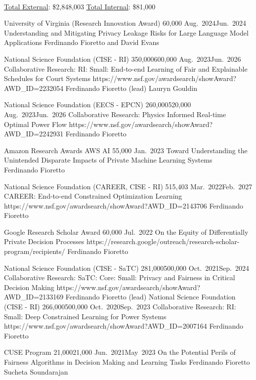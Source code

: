 \
\begin{keywords}
{\underline{Total External}: \$2,848,003 %
\hspace{8pt} \underline{Total Internal}: \$81,000}%
\end{keywords}


\begin{projects}
	\grantentrySinglePI
	{University of Virginia (Research Innovation Award)}
	{60,000}
	{Aug.~2024}{Jun.~2024}
	{Understanding and Mitigating Privacy Leakage Risks for Large Language Model Applications}
	{}
	{Ferdinando Fioretto and David Evans}

	\grantentrycoPI
	{National Science Foundation (CISE - RI)}
	{350,000}{600,000}
	{Aug.~2023}{Jun.~2026}
	{Collaborative Research: RI: Small: End-to-end Learning of Fair and Explainable Schedules for Court Systems}
	{https://www.nsf.gov/awardsearch/showAward?AWD_ID=2232054}
	{Ferdinando Fioretto (lead)}
	{Lauryn Gouldin}

	\grantentryPI
	{National Science Foundation (EECS - EPCN)}
	{260,000}{520,000}
	{Aug.~2023}{Jun.~2026}
	{Collaborative Research: Physics Informed Real-time Optimal Power Flow}
	{https://www.nsf.gov/awardsearch/showAward?AWD_ID=2242931}
	{Ferdinando Fioretto}

	\grantentrySinglePI
	{Amazon Research Awards AWS AI}
	{55,000}
	{Jan.~2023}{}
	{Toward Understanding the Unintended Disparate Impacts of  Private Machine Learning Systems}
	{~}
	{Ferdinando Fioretto}

\end{projects}

\begin{projects}

	\grantentrySinglePI
	{National Science Foundation (CAREER, CISE - RI)}
	{515,403}
	{Mar.~2022}{Feb.~2027}
	{CAREER: End-to-end Constrained Optimization Learning}
	{https://www.nsf.gov/awardsearch/showAward?AWD_ID=2143706}
	{Ferdinando Fioretto}
	
	\grantentrySinglePI
	{Google Research Scholar Award}
	{60,000}
	{Jul.~2022}{}
	{On the Equity of Differentially Private Decision Processes}
	{https://research.google/outreach/research-scholar-program/recipients/}
	{Ferdinando Fioretto}

	\grantentryPI
	{National Science Foundation (CISE - SaTC)}
	{281,000}{500,000}
	{Oct.~2021}{Sep.~2024}
	{Collaborative Research: SaTC: Core: Small: Privacy and Fairness in Critical Decision Making}
	{https://www.nsf.gov/awardsearch/showAward?AWD_ID=2133169}
	{Ferdinando Fioretto (lead)}
	\grantentryPI
	{National Science Foundation (CISE - RI)}
	{266,000}{500,000}
	{Oct.~2020}{Sep.~2023}
	{Collaborative Research: RI: Small: Deep Constrained Learning for Power Systems}
	{https://www.nsf.gov/awardsearch/showAward?AWD_ID=2007164}
	{Ferdinando Fioretto}

\grantentrycoPI
	{CUSE Program}
	{21,000}{21,000}
	{Jun.~2021}{May~2023}
	{On the Potential Perils of Fairness Algorithms in Decision Making and Learning Tasks}
	{}
	{Ferdinando Fioretto}
	{Sucheta Soundarajan}
\end{projects}


